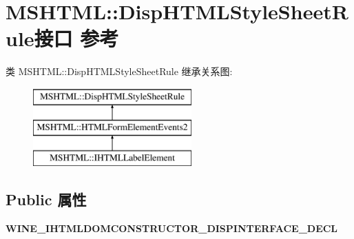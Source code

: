 \hypertarget{interface_m_s_h_t_m_l_1_1_disp_h_t_m_l_style_sheet_rule}{}\section{M\+S\+H\+T\+ML\+:\+:Disp\+H\+T\+M\+L\+Style\+Sheet\+Rule接口 参考}
\label{interface_m_s_h_t_m_l_1_1_disp_h_t_m_l_style_sheet_rule}
类 M\+S\+H\+T\+ML\+:\+:Disp\+H\+T\+M\+L\+Style\+Sheet\+Rule 继承关系图\+:\begin{figure}[H]
\begin{center}
\leavevmode
\includegraphics[height=3.000000cm]{interface_m_s_h_t_m_l_1_1_disp_h_t_m_l_style_sheet_rule}
\end{center}
\end{figure}
\subsection*{Public 属性}
\begin{DoxyCompactItemize}
\item 
\mbox{\label{interface_m_s_h_t_m_l_1_1_disp_h_t_m_l_style_sheet_rule_ababc7a9710ff27d70bff3c39e75fdbf9}} 
{\bfseries W\+I\+N\+E\+\_\+\+I\+H\+T\+M\+L\+D\+O\+M\+C\+O\+N\+S\+T\+R\+U\+C\+T\+O\+R\+\_\+\+D\+I\+S\+P\+I\+N\+T\+E\+R\+F\+A\+C\+E\+\_\+\+D\+E\+CL}
\end{DoxyCompactItemize}
